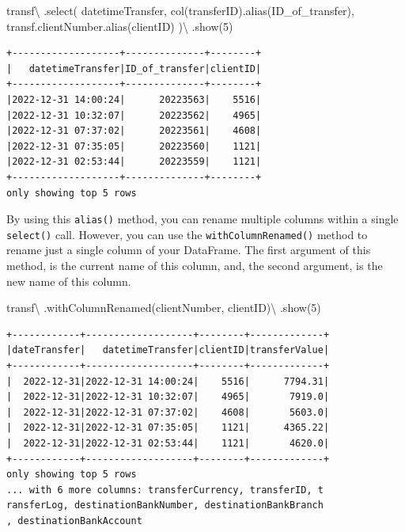 \documentclass[
  11pt,
  letterpaper,
  DIV=11,
  numbers=noendperiod]{scrreprt}
\newenvironment{Shaded}{\begin{snugshade}}{\end{snugshade}}
\newcommand{\DecValTok}[1]{\textcolor[rgb]{0.68,0.00,0.00}{#1}}
\newcommand{\NormalTok}[1]{\textcolor[rgb]{0.00,0.23,0.31}{#1}}
\newcommand{\OperatorTok}[1]{\textcolor[rgb]{0.37,0.37,0.37}{#1}}
\newcommand{\StringTok}[1]{\textcolor[rgb]{0.13,0.47,0.30}{#1}}
\begin{document}
\begin{Shaded}
\begin{Highlighting}[]
\NormalTok{transf}\OperatorTok{\textbackslash{}}
\NormalTok{  .select(}
    \StringTok{\textquotesingle{}datetimeTransfer\textquotesingle{}}\NormalTok{,}
\NormalTok{    col(}\StringTok{\textquotesingle{}transferID\textquotesingle{}}\NormalTok{).alias(}\StringTok{\textquotesingle{}ID\_of\_transfer\textquotesingle{}}\NormalTok{),}
\NormalTok{    transf.clientNumber.alias(}\StringTok{\textquotesingle{}clientID\textquotesingle{}}\NormalTok{)}
\NormalTok{  )}\OperatorTok{\textbackslash{}}
\NormalTok{  .show(}\DecValTok{5}\NormalTok{)}
\end{Highlighting}
\end{Shaded}

\begin{verbatim}
+-------------------+--------------+--------+
|   datetimeTransfer|ID_of_transfer|clientID|
+-------------------+--------------+--------+
|2022-12-31 14:00:24|      20223563|    5516|
|2022-12-31 10:32:07|      20223562|    4965|
|2022-12-31 07:37:02|      20223561|    4608|
|2022-12-31 07:35:05|      20223560|    1121|
|2022-12-31 02:53:44|      20223559|    1121|
+-------------------+--------------+--------+
only showing top 5 rows
\end{verbatim}

By using this \texttt{alias()} method, you can rename multiple columns
within a single \texttt{select()} call. However, you can use the
\texttt{withColumnRenamed()} method to rename just a single column of
your DataFrame. The first argument of this method, is the current name
of this column, and, the second argument, is the new name of this
column.

\begin{Shaded}
\begin{Highlighting}[]
\NormalTok{transf}\OperatorTok{\textbackslash{}}
\NormalTok{  .withColumnRenamed(}\StringTok{\textquotesingle{}clientNumber\textquotesingle{}}\NormalTok{, }\StringTok{\textquotesingle{}clientID\textquotesingle{}}\NormalTok{)}\OperatorTok{\textbackslash{}}
\NormalTok{  .show(}\DecValTok{5}\NormalTok{)}
\end{Highlighting}
\end{Shaded}

\begin{verbatim}
+------------+-------------------+--------+-------------+
|dateTransfer|   datetimeTransfer|clientID|transferValue|
+------------+-------------------+--------+-------------+
|  2022-12-31|2022-12-31 14:00:24|    5516|      7794.31|
|  2022-12-31|2022-12-31 10:32:07|    4965|       7919.0|
|  2022-12-31|2022-12-31 07:37:02|    4608|       5603.0|
|  2022-12-31|2022-12-31 07:35:05|    1121|      4365.22|
|  2022-12-31|2022-12-31 02:53:44|    1121|       4620.0|
+------------+-------------------+--------+-------------+
only showing top 5 rows
... with 6 more columns: transferCurrency, transferID, t
ransferLog, destinationBankNumber, destinationBankBranch
, destinationBankAccount
\end{verbatim}
\end{document}
